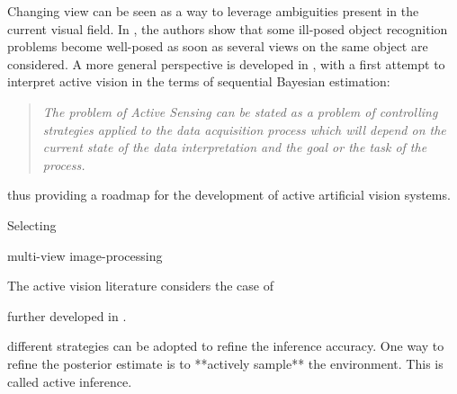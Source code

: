 \documentclass{article}
\begin{document}
Changing view can be seen as a way to leverage ambiguities present in the current visual field. In \cite{aloimonos1988active}, the authors show that some ill-posed object recognition problems become well-posed as soon as several views on the  same object are considered. 
A more general perspective is developed in \cite{bajcsy1988active}, with a first attempt to interpret active vision in the terms of sequential Bayesian estimation:
\begin{quote}
\emph{The problem  of Active Sensing can be stated as a problem of controlling strategies 
applied to the data acquisition process which will depend on the current state 
of the data interpretation and  the  goal  or the  task of  the  process.}
\end{quote}
thus providing a roadmap for the development of active artificial vision systems.

Selecting 
 
multi-view image-processing

The active vision literature considers the case of 




 further developed in \cite{najemnik2005optimal,butko2010infomax,ahmad2013active,potthast2016active}.



{ different strategies can be adopted to refine the inference accuracy. One way to refine the posterior estimate is to **actively sample** the environment. This is called active inference.} 
	


\end{document}
